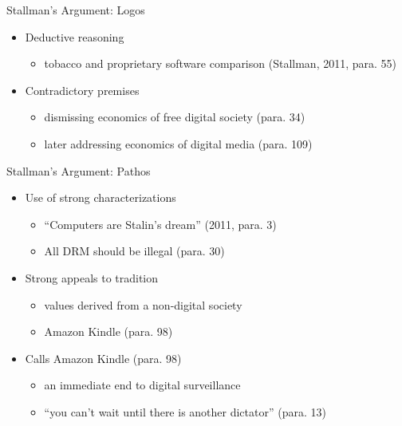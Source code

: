 \begin{frame}{Stallman’s Argument: Logos}
\begin{itemize}
  \item Deductive reasoning
    \begin{itemize}
      \item tobacco and proprietary software comparison (Stallman, 2011, para. 55)
      \end{itemize}
      \item Contradictory premises
        \begin{itemize}
          \item dismissing economics of free digital society (para. 34)
          \item later addressing economics of digital media (para. 109)
        \end{itemize}
        \end{itemize}
\end{frame}

\begin{frame}{Stallman’s Argument: Pathos}
\begin{itemize}
  \item Use of strong characterizations
    \begin{itemize}
      \item ``Computers are Stalin’s dream'' (2011, para. 3) 
      \item All DRM should be illegal (para. 30) 
    \end{itemize}
  \item Strong appeals to tradition
    \begin{itemize}
      \item values derived from a non-digital society
      \item Amazon Kindle (para. 98)
    \end{itemize}    
  \item Calls Amazon Kindle (para. 98)
    \begin{itemize}
      \item an immediate end to digital surveillance
      \item “you can’t wait until there is another dictator” (para. 13) 
     \end{itemize}
\end{itemize}
\end{frame}


        